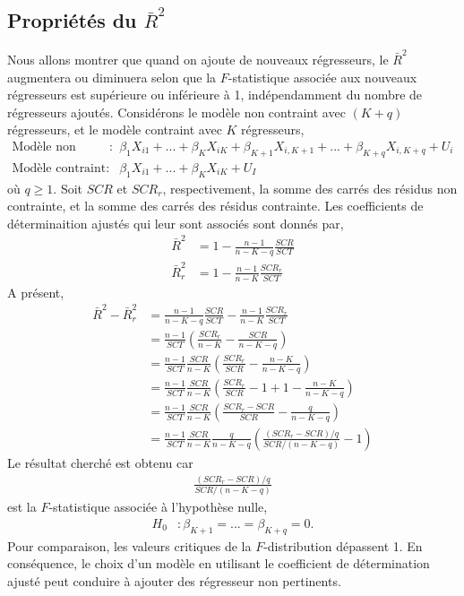 \documentclass[10pt, reqno]{amsart}
\begin{document}
\subsection{Propriétés du $\bar{R}^2$}
Nous allons montrer que quand on  ajoute de nouveaux régresseurs, le $\bar{R}^2$ augmentera ou diminuera selon que la $F$-statistique associée aux nouveaux régresseurs est supérieure ou inférieure à 1, indépendamment du nombre de régresseurs ajoutés. Considérons le modèle non contraint avec $(K+q)$ régresseurs, et le modèle contraint avec $K$ régresseurs,
\begin{align*}
\textrm{Modèle non contraint}: & \beta_1X_{i1} + ...+\beta_KX_{iK} + \beta_{K+1}X_{i,K+1} +  ...+\beta_{K+q}X_{i,K+q} + U_i\\
\textrm{Modèle contraint}: &  \beta_1X_{i1} +...+\beta_KX_{iK} + U_I
\end{align*}
où $q\geq 1$. Soit $SCR$ et $SCR_r$, respectivement, la somme des carrés des résidus non contrainte, et la somme des carrés des résidus contrainte. Les coefficients de déterminaition ajustés qui leur sont associés sont donnés par,
\begin{align*}
\bar{R}^2 &= 1 - \frac{n-1}{n-K-q}\frac{SCR}{SCT}\\
\bar{R}^2_r &= 1 - \frac{n-1}{n-K}\frac{SCR_r}{SCT}
\end{align*}
A présent,
\begin{align*}
\bar{R}^2 - \bar{R}^2_r &= \frac{n-1}{n-K-q}\frac{SCR}{SCT} - \frac{n-1}{n-K}\frac{SCR_r}{SCT}\\
&= \frac{n-1}{SCT}\left(\frac{SCR_r}{n-K} - \frac{SCR}{n-K-q}\right)\\
&=\frac{n-1}{SCT}\frac{SCR}{n-K}\left(\frac{SCR_r}{SCR} - \frac{n-K}{n-K-q}\right)\\
&=\frac{n-1}{SCT}\frac{SCR}{n-K}\left(\frac{SCR_r}{SCR} -1+1- \frac{n-K}{n-K-q}\right)\\
&=\frac{n-1}{SCT}\frac{SCR}{n-K}\left(\frac{SCR_r - SCR}{SCR} - \frac{q}{n-K-q}\right)\\
&=\frac{n-1}{SCT}\frac{SCR}{n-K} \frac{q}{n-K-q}\left(\frac{(SCR_r - SCR)/q}{SCR/(n-K-q)} - 1\right)
\end{align*}
Le résultat cherché est obtenu car 
\begin{align*} 
\frac{(SCR_r - SCR)/q}{SCR/(n-K-q)}
\end{align*}
est la $F$-statistique associée à l'hypothèse nulle,
\begin{align*}
H_0&:\beta_{K+1}=...=\beta_{K+q}=0.
\end{align*}
Pour comparaison, les valeurs critiques de la $F$-distribution dépassent 1. En conséquence, le choix d'un  modèle en utilisant le coefficient de détermination ajusté peut conduire à ajouter des régresseur non pertinents.
\end{document}
